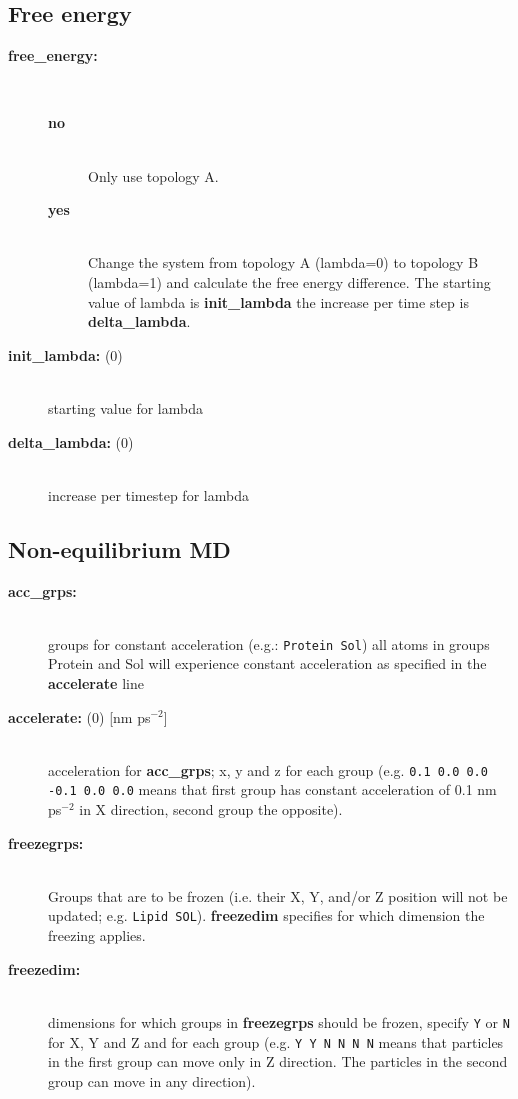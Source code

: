 \subsection{Free energy}
\begin{description}
\item[{\bf free\_energy:}]\mbox{}\\
\vspace{-2ex}\begin{description}
\item[{\bf no}]\mbox{}\\
Only use topology A. 
\item[{\bf yes}]\mbox{}\\
Change the system from topology A (lambda=0) to topology B (lambda=1)
and calculate the free energy difference.
The starting value of lambda is {\bf init\_lambda} the increase
per time step is {\bf delta\_lambda}.
\end{description}
\item[{\bf init\_lambda: }(0)]\mbox{}\\
starting value for lambda
\item[{\bf delta\_lambda: }(0)]\mbox{}\\
increase per timestep for lambda
\end{description}

\subsection{Non-equilibrium MD}
\begin{description}
\item[{\bf acc\_grps: }]\mbox{}\\
groups for constant acceleration (e.g.: {\tt Protein Sol})
all atoms in groups Protein and Sol will experience constant acceleration
as specified in the {\bf accelerate} line
\item[{\bf accelerate: }(0) {[nm ps$^{-2}$]}]\mbox{}\\
acceleration for {\bf acc\_grps}; x, y and z for each group
(e.g. {\tt 0.1 0.0 0.0 -0.1 0.0 0.0} means that first group has constant 
acceleration of 0.1 nm ps$^{-2}$ in X direction, second group the 
opposite).
\item[{\bf freezegrps: }]\mbox{}\\
Groups that are to be frozen (i.e. their X, Y, and/or Z position will
not be updated; e.g. {\tt Lipid SOL}). {\bf freezedim} specifies for
which dimension the freezing applies.
\item[{\bf freezedim: }]\mbox{}\\
dimensions for which groups in {\bf freezegrps} should be frozen, 
specify {\tt Y} or {\tt N} for X, Y and Z and for each group
(e.g. {\tt Y Y N N N N} means that particles in the first group 
can move only in Z direction. The particles in the second group can 
move in any direction).
\end{description}

